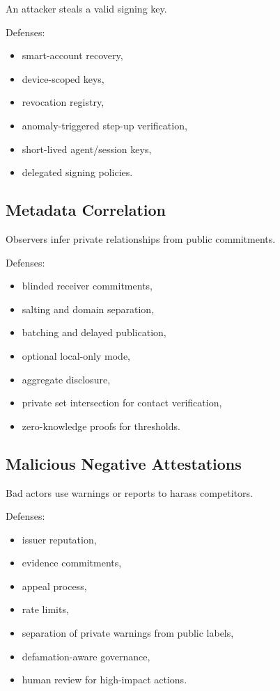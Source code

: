\documentclass[11pt]{article}
\begin{document}
An attacker steals a valid signing key.

Defenses:

\begin{itemize}
    \item smart-account recovery,
    \item device-scoped keys,
    \item revocation registry,
    \item anomaly-triggered step-up verification,
    \item short-lived agent/session keys,
    \item delegated signing policies.
\end{itemize}

\subsection{Metadata Correlation}

Observers infer private relationships from public commitments.

Defenses:

\begin{itemize}
    \item blinded receiver commitments,
    \item salting and domain separation,
    \item batching and delayed publication,
    \item optional local-only mode,
    \item aggregate disclosure,
    \item private set intersection for contact verification,
    \item zero-knowledge proofs for thresholds.
\end{itemize}

\subsection{Malicious Negative Attestations}

Bad actors use warnings or reports to harass competitors.

Defenses:

\begin{itemize}
    \item issuer reputation,
    \item evidence commitments,
    \item appeal process,
    \item rate limits,
    \item separation of private warnings from public labels,
    \item defamation-aware governance,
    \item human review for high-impact actions.
\end{itemize}
\end{document}
